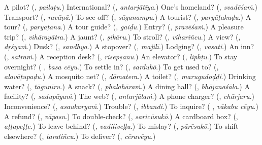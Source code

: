 \begin{tcolorbox}[breakable,colback=teal!4,colframe=teal!35!black,title={Before you move on}]
A pilot? (\textbf{}, \emph{pailaṭu}.) International? (\textbf{}, \emph{antarjātīya}.) One's homeland? (\textbf{}, \emph{svadēśaṁ}.) Transport? (\textbf{}, \emph{ravāṇā}.) To see off? (\textbf{}, \emph{sāganampu}.) A tourist? (\textbf{}, \emph{paryāṭakuḍu}.) A tour? (\textbf{}, \emph{paryaṭana}.) A tour guide? (\textbf{}, \emph{gaiḍu}.) Entry? (\textbf{}, \emph{pravēśaṁ}.) A pleasure trip? (\textbf{}, \emph{vihārayātra}.) A jaunt? (\textbf{}, \emph{ṣikāru}.) To stroll? (\textbf{}, \emph{vihariñcu}.) A view? (\textbf{}, \emph{dṛśyaṁ}.) Dusk? (\textbf{}, \emph{sandhya}.) A stopover? (\textbf{}, \emph{majilī}.) Lodging? (\textbf{}, \emph{vasati}.) An inn? (\textbf{}, \emph{satraṁ}.) A reception desk? (\textbf{}, \emph{risepṣanu}.) An elevator? (\textbf{}, \emph{liphṭu}.) To stay overnight? (\textbf{ }, \emph{basa cēyu}.) To settle in? (\textbf{}, \emph{sardukō}.) To get used to? (\textbf{}, \emph{alavāṭupaḍu}.) A mosquito net? (\textbf{}, \emph{dōmatera}.) A toilet? (\textbf{}, \emph{marugudoḍḍi}.) Drinking water? (\textbf{}, \emph{tāgunīru}.) A snack? (\textbf{}, \emph{phalahāraṁ}.) A dining hall? (\textbf{}, \emph{bhōjanaśāla}.) A facility? (\textbf{}, \emph{sadupāyaṁ}.) The web? (\textbf{}, \emph{antarjālaṁ}.) A phone charger? (\textbf{}, \emph{chārjaru}.) Inconvenience? (\textbf{}, \emph{asaukaryaṁ}.) Trouble? (\textbf{}, \emph{ibbandi}.) To inquire? (\textbf{ }, \emph{vākabu cēyu}.) A refund? (\textbf{}, \emph{vāpasu}.) To double-check? (\textbf{}, \emph{saricūsukō}.) A cardboard box? (\textbf{}, \emph{aṭṭapeṭṭe}.) To leave behind? (\textbf{}, \emph{vadiliveḷḷu}.) To mislay? (\textbf{}, \emph{pārēsukō}.) To shift elsewhere? (\textbf{}, \emph{taraliñcu}.) To deliver? (\textbf{}, \emph{cēravēyu}.)
\end{tcolorbox}

